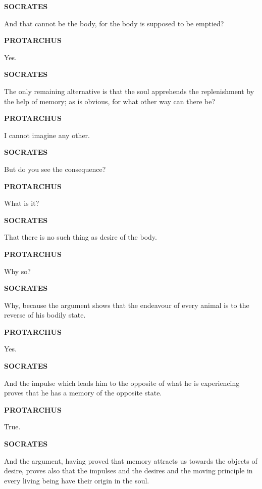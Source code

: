\documentclass[11pt,letter]{article}
\begin{document}
\par \textbf{SOCRATES}
\par   And that cannot be the body, for the body is supposed to be emptied?

\par \textbf{PROTARCHUS}
\par   Yes.

\par \textbf{SOCRATES}
\par   The only remaining alternative is that the soul apprehends the replenishment by the help of memory; as is obvious, for what other way can there be?

\par \textbf{PROTARCHUS}
\par   I cannot imagine any other.

\par \textbf{SOCRATES}
\par   But do you see the consequence?

\par \textbf{PROTARCHUS}
\par   What is it?

\par \textbf{SOCRATES}
\par   That there is no such thing as desire of the body.

\par \textbf{PROTARCHUS}
\par   Why so?

\par \textbf{SOCRATES}
\par   Why, because the argument shows that the endeavour of every animal is to the reverse of his bodily state.

\par \textbf{PROTARCHUS}
\par   Yes.

\par \textbf{SOCRATES}
\par   And the impulse which leads him to the opposite of what he is experiencing proves that he has a memory of the opposite state.

\par \textbf{PROTARCHUS}
\par   True.

\par \textbf{SOCRATES}
\par   And the argument, having proved that memory attracts us towards the objects of desire, proves also that the impulses and the desires and the moving principle in every living being have their origin in the soul.
\end{document}
